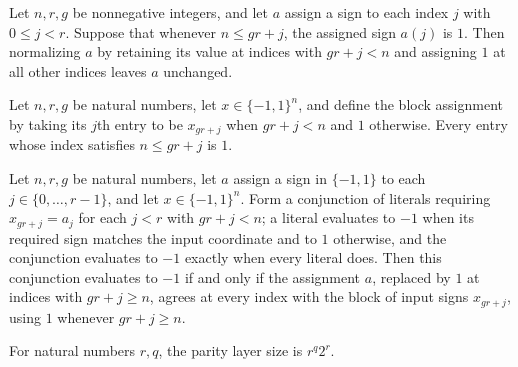 \begin{theorem}
\label{FABL.normalizeParityBlockAssignment_eq_self}
\leanok
{}
Let $n,r,g$ be nonnegative integers, and let $a$ assign a sign to each index $j$ with
$0\le j<r$. Suppose that whenever $n\le gr+j$, the assigned sign $a(j)$ is $1$. Then
normalizing $a$ by retaining its value at indices with $gr+j<n$ and assigning $1$ at all
other indices leaves $a$ unchanged.
\end{theorem}

\begin{theorem}
\label{FABL.parityBlockValue_valid}
\leanok
{}
Let $n,r,g$ be natural numbers, let $x\in\{-1,1\}^n$, and define the block assignment by
taking its $j$th entry to be $x_{gr+j}$ when $gr+j<n$ and $1$ otherwise. Every entry
whose index satisfies $n\le gr+j$ is $1$.
\end{theorem}

\begin{theorem}
\label{FABL.parityBlockMinterm_eval_eq_neg_one_iff}
\leanok
{}
Let $n,r,g$ be natural numbers, let $a$ assign a sign in $\{-1,1\}$ to each
$j\in\{0,\ldots,r-1\}$, and let $x\in\{-1,1\}^n$. Form a conjunction of literals
requiring $x_{gr+j}=a_j$ for each $j<r$ with $gr+j<n$; a literal evaluates to $-1$ when
its required sign matches the input coordinate and to $1$ otherwise, and the conjunction
evaluates to $-1$ exactly when every literal does. Then this conjunction evaluates to
$-1$ if and only if the assignment $a$, replaced by $1$ at indices with $gr+j\ge n$,
agrees at every index with the block of input signs $x_{gr+j}$, using $1$ whenever
$gr+j\ge n$.
\end{theorem}

\begin{definition}
\label{FABL.parityLayerSize}
\leanok
For natural numbers $r,q$, the parity layer size is $r^q 2^r$.
\end{definition}

